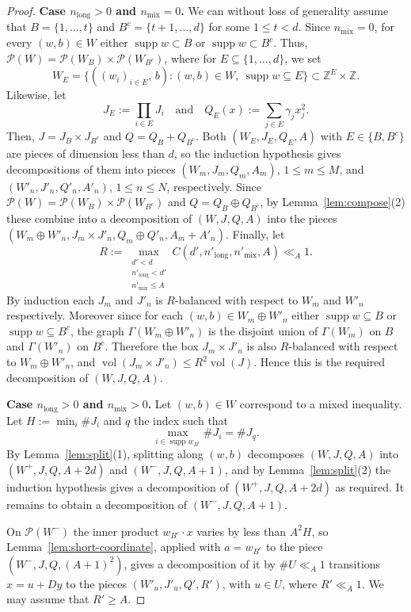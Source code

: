 \documentclass[a4paper,reqno,12pt]{amsart}
\theoremstyle{plain}
\theoremstyle{plain}
\theoremstyle{remark}
\theoremstyle{plain}
\newcommand{\cP}{\mathscr{P}}
\newcommand{\Z}{\mathbb{Z}}
\newcommand{\supp}{\operatorname{supp}}
\newcommand{\vol}{\operatorname{vol}}
\theoremstyle{plain}
\theoremstyle{plain}
\begin{document}
{\begin{proof}
\textbf{Case $n_{\text{long}} > 0$ and $n_{\text{mix}} = 0$.} 
We can without loss of generality assume that 
$B = \{1, \ldots, t\}$ and $B^c = \{t + 1, \ldots, d\}$ for
some $1 \leq t < d$.
Since $n_{\text{mix}} = 0$, for every $(w,b) \in W$ either $\supp w \subset B$
or $\supp w \subset B^c$. Thus,
$\cP(W)=\cP(W_B)\times\cP(W_{B^c})$, where for $E \subseteq \{1, \ldots, d\}$, we set
$$W_E=\bigl\{((w_i)_{i\in E},\,b):(w,b)\in W,\ \supp w\subseteq E\bigr\}\subset\Z^E\times\Z.$$ 
{Likewise, let} 
$$
J_E := \prod_{i \in E} J_i {\quad \text{and} \quad} Q_E(x) := \sum_{j \in E} \gamma_j x_j^2.
$$
Then, $J=J_B\times J_{B^c}$ and
$Q=Q_B+Q_{B^c}$. Both $(W_E, J_E, Q_E, A)$ with $E \in \{B, B^c\}$ are pieces of dimension 
less than $d$, so the induction hypothesis gives decompositions of them into pieces
$(W_m,J_m,Q_m,A_m)$, $1\le m\le M$, and $(W'_n,J'_n,Q'_n,A'_n)$, $1\le n\le N$, respectively. Since
$\cP(W)=\cP(W_B)\times\cP(W_{B^c})$ and $Q=Q_B\oplus Q_{B^c}$, by Lemma~\ref{lem:compose}(2) these
combine into a decomposition of $(W,J,Q,A)$ into the pieces
$(W_m\oplus W'_n,J_m\times J'_n,Q_m\oplus Q'_n,A_m+A'_n)$.
Finally, let 
$$
R := \max_{\substack{d'<d \\ n'_{\text{long}}<d' \\ n'_{\text{mix}} \leq A}} C(d',n'_{\text{long}},n'_{\text{mix}},A)\ll_A1.
$$
By induction each $J_m$ and $J'_n$ is $R$-balanced with respect to $W_m$
and $W'_n$ respectively. Moreover since for each $(w,b) \in W_m \oplus W'_n$ either 
$\supp w \subseteq B$ or $\supp w \subseteq B^c$, the graph $\Gamma(W_m \oplus W'_n)$ 
is the disjoint union of $\Gamma(W_m)$ on $B$ and $\Gamma(W'_n)$ on $B^c$. 
Therefore the box $J_m \times J'_n$ is also $R$-balanced with respect to 
$W_m \oplus W'_n$, and $\vol(J_m\times J'_n)\le R^2\vol(J)$. 
Hence this is the required decomposition of $(W,J,Q,A)$.

\textbf{Case $n_{\text{long}} > 0$ and $n_{\text{mix}} > 0$.} 
Let $(w,b) \in W$ correspond to a mixed inequality.
Let $H := \min_i \# J_i$ and $q$ the index such that 
$$
\max_{i \in \supp w_{B^c}} \# J_i = \# J_q.
$$
By Lemma~\ref{lem:split}(1), splitting along $(w,b)$ decomposes $(W,J,Q,A)$ into
$(W^+,J,Q,A+2d)$ and $(W^-,J,Q,A+1)$, and by Lemma~\ref{lem:split}(2) the induction hypothesis gives
a decomposition of $(W^+,J,Q,A+2d)$ as required. It remains to obtain a decomposition of
$(W^-,J,Q,A+1)$.

On $\cP(W^-)$ the inner product $w_{B^c}\cdot x$ varies by less than $A^2H$, so
Lemma~\ref{lem:short-coordinate}, applied with $a=w_{B^c}$ to the piece $(W^-,J,Q,(A+1)^2)$, gives a decomposition of it by $\#U\ll_A1$ transitions $x=u+Dy$ to the pieces $(W'_u,J'_u,Q',R')$,  with $u\in U$, where $R'\ll_A1${. We} may
assume that $R'\ge A$.


\end{proof}}
\end{document}
